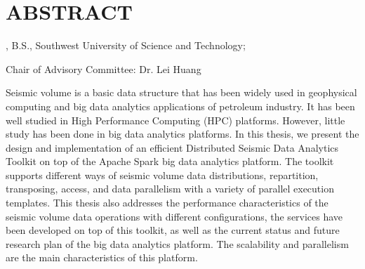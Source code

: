 %
%
%

\chapter*{ABSTRACT}

\pagestyle{plain} %
\setcounter{page}{2}

\begin{center}
\pvamumanuscripttitle

\pvamugradmonth \hspace{2pt} \pvamugradyear

\pvamufullname, B.S., Southwest University of Science and Technology;

Chair of Advisory Committee: Dr. Lei Huang 

\par\end{center}

\indent Seismic volume is a basic data structure that has been widely used in geophysical computing and big data analytics applications of petroleum industry. It has been well studied in High Performance Computing (HPC) platforms. However, little study has been done in big data analytics platforms. In this thesis, we present the design and implementation of an efficient Distributed Seismic Data Analytics Toolkit on top of the Apache Spark big data analytics platform. The toolkit supports different ways of seismic volume data distributions, repartition, transposing, access, and data parallelism with a variety of parallel execution templates. This thesis also addresses the performance characteristics of the seismic volume data operations with different configurations, the services have been developed on top of this toolkit, as well as the current status and future research plan of the big data analytics platform. The scalability and parallelism are the main characteristics of this platform.


 

\pagebreak{}
